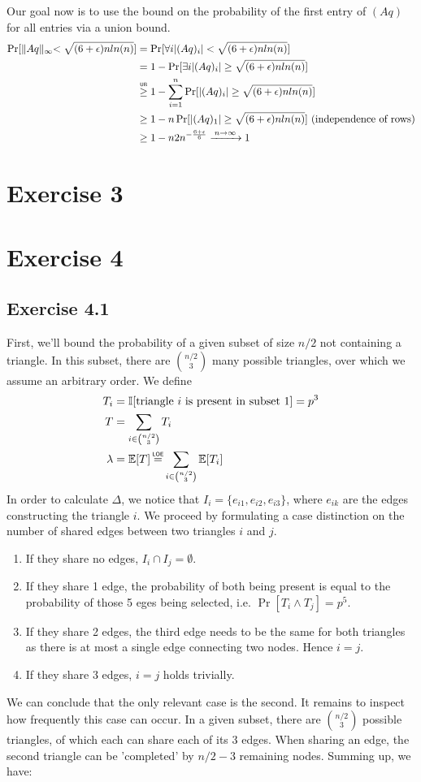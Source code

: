 \documentclass[a4paper,german]{article}
\newcommand\loe{\mathrel{\overset{\makebox[0pt]{\mbox{\normalfont\tiny\sffamily LOE}}}{=}}}
\newcommand\gequb{\mathrel{\overset{\makebox[0pt]{\mbox{\normalfont\tiny\sffamily UB}}}{\geq}}}
\newcommand{\E}{\mathbb{E}}
\begin{document}
Our goal now is to use the bound on the probability of the first entry of \( (Aq) \) for all entries via a union bound.
\begin{align*}
\Pr[ \lVert Aq \lVert_{\infty} < \sqrt {(6+\epsilon)nln(n)}] &= \Pr[ \forall i  |(Aq)_i|  < \sqrt {(6+\epsilon)nln(n)}] \\
&= 1 - \Pr[ \exists i  |(Aq)_i|  \geq \sqrt {(6+\epsilon)nln(n)}] \\
&\gequb 1 - \sum_{i=1}^n \Pr[|(Aq)_i|  \geq \sqrt {(6+\epsilon)nln(n)}] \\
&\geq 1 - n \Pr[|(Aq)_1|  \geq \sqrt {(6+\epsilon)nln(n)}] \text{     (independence of rows)}\\
&\geq 1 - n 2 n^{-\frac{6+\epsilon}{6}}  \xrightarrow{\: n \to \infty \: } 1
\end{align*}
\section*{Exercise 3}
\section*{Exercise 4}
\subsection*{Exercise 4.1}
First, we'll bound the probability of a given subset of size \(n/2\) not containing a triangle. In this subset, there are \( {n/2 \choose 3}\) many possible triangles, over which we assume an arbitrary order. We define 
\begin{align*} 
T_i &= \mathbb{I} [\text{triangle } i \text{ is present in subset } 1] = p^3 \\
T &= \sum_{i \in {n/2 \choose 3}} T_i \\
\lambda &= \E[T] \loe \sum_{i \in {n/2 \choose 3}} \E[T_i]
\end{align*}
In order to calculate \(\Delta\), we notice that \(I_i = \{e_{i1}, e_{i2}, e_{i3} \}\), where \(e_{ik}\) are the edges constructing the triangle \(i\). We proceed by formulating a case distinction on the number of shared edges between two triangles \(i\) and \(j\).
\begin{enumerate}
\item If  they share no edges, \(I_i \cap I_j = \emptyset \).
\item If they share 1 edge, the probability of both being present is equal to the probability of those 5 eges being selected, i.e. \(\Pr[T_i \wedge T_j] = p^5\).
\item If they share 2 edges, the third edge needs to be the same for both triangles as there is at most a single edge connecting two nodes. Hence \(i = j\).
\item If they share 3 edges, \(i = j\) holds trivially. 
\end{enumerate}
We can conclude that the only relevant case is the second. It remains to inspect how frequently this case can occur. In a given subset, there are \( {n/2 \choose 3} \) possible triangles, of which each can share each of its 3 edges. When sharing an edge, the second triangle can be 'completed' by \(n/2 -3\) remaining nodes. Summing up, we have:
\end{document}
